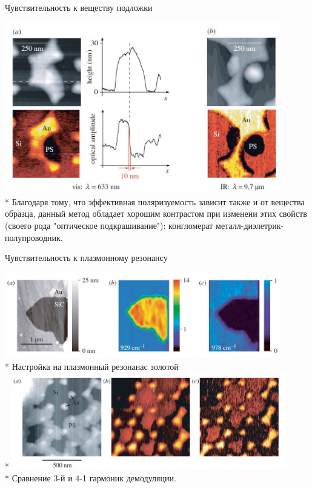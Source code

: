 \documentclass[9pt, compress, xcolor=table]{beamer}
\begin{document}
\begin{frame}{Чувствительность к веществу подложки}

\begin{center}
\includegraphics[width=0.9\textwidth]{nfm10}
\\* 
Благодаря тому, что эффективная поляризуемость зависит также и от вещества образца, данный метод обладает хорошим контрастом при изменеии этих свойств (своего рода "оптическое подкрашивание"): конгломерат металл-диэлетрик-полупроводник.
\end{center}

\end{frame}

\begin{frame}{Чувствительность к плазмонному резонансу}

\begin{center}
\includegraphics[width=0.9\textwidth]{nfm12}
\\* Настройка на плазмонный резонанас золотой
\\*
\includegraphics[width=0.9\textwidth]{nfm11}
\\* Сравнение 3-й и 4-1 гармоник демодуляции.
\end{center}

\end{frame}
\end{document}
